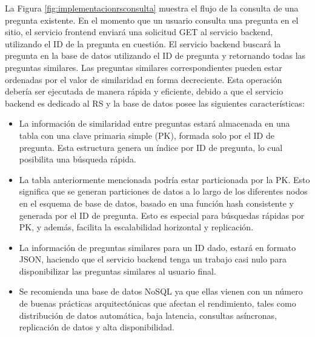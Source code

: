 La Figura \ref{fig:implementacionrsconsulta} muestra el flujo de la consulta de una pregunta existente. En el momento que un usuario consulta una pregunta en el sitio, el servicio frontend enviará una solicitud GET al servicio backend, utilizando el ID de la pregunta en cuestión. El servicio backend buscará la pregunta en la base de datos utilizando el ID de pregunta y retornando todas las preguntas similares. Las preguntas similares correspondientes pueden estar ordenadas por el valor de similaridad en forma decreciente. Esta operación debería ser ejecutada de manera rápida y eficiente, debido a que el servicio backend es dedicado al RS y la base de datos posee las siguientes características:
\begin{itemize}
	\item La información de similaridad entre preguntas estará almacenada en una tabla con una clave primaria simple (PK), formada solo por el ID de pregunta. Esta estructura genera un índice por ID de pregunta, lo cual posibilita una búsqueda rápida.
	\item La tabla anteriormente mencionada podría estar particionada por la PK. Esto significa que se generan particiones de datos a lo largo de los diferentes nodos en el esquema de base de datos, basado en una función hash consistente y generada por el ID de pregunta. Esto es especial para búsquedas rápidas por PK, y además, facilita la escalabilidad horizontal y replicación.
	\item La información de preguntas similares para un ID dado, estará en formato JSON, haciendo que el servicio backend tenga un trabajo casi nulo para disponibilizar las preguntas similares al usuario final.
	\item Se recomienda una base de datos NoSQL ya que ellas vienen con un número de buenas prácticas arquitectónicas que afectan el rendimiento, tales como distribución de datos automática, baja latencia, consultas asíncronas, replicación de datos y alta disponibilidad.
\end{itemize}


